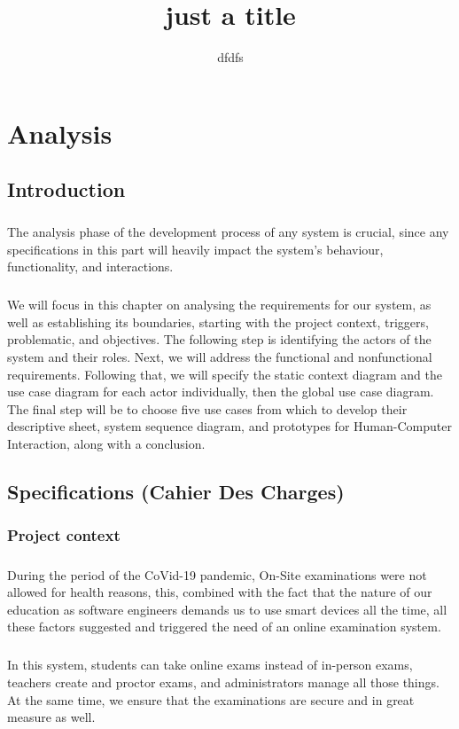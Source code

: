 \documentclass[]{uc2pfecaneva}
\title{just a title}
\author{dfdfs}
\begin{document}
	\tableofcontents
	\listoffigures
	\listoftables
\chapter{Analysis}

\newpage

\section{Introduction}
\justifying\paragraph{}
	The analysis phase of the development process of any system is crucial, since any specifications in this part will heavily impact the system's behaviour, functionality, and interactions.

\justifying\paragraph{}
	We will focus in this chapter on analysing the requirements for our system, as well as establishing its boundaries, starting with the project context, triggers, problematic, and objectives. The following step is identifying the actors of the system and their roles. Next, we will address the functional and nonfunctional requirements. Following that, we will specify the static context diagram and the use case diagram for each actor individually, then the global use case diagram. The final step will be to choose five use cases from which to develop their descriptive sheet, system sequence diagram, and prototypes for Human-Computer Interaction, along with a conclusion.

\section{Specifications (Cahier Des Charges)}
\subsection{Project context}
\justifying\paragraph{}
	During the period of the CoVid-19 pandemic, On-Site examinations were not allowed for health reasons, this, combined with the fact that the nature of our education as software engineers demands us to use smart devices all the time, all these factors suggested and triggered the need of an online examination system.
\justifying\paragraph{}
	In this system, students can take online exams instead of in-person exams, teachers create and proctor exams, and administrators manage all those things. At the same time, we ensure that the examinations are secure and in great measure as well.
\end{document}

